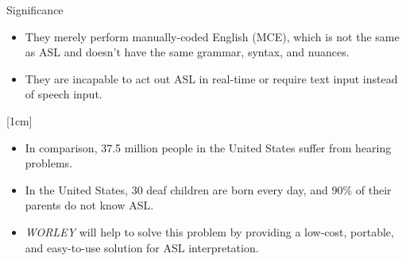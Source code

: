 \documentclass[final, 20pt]{beamer}
\newlength{\colwidth}
\newlength{\twocolwidth}
\begin{document}
\begin{frame}[t]
\begin{columns}[t]
\begin{column}{\twocolwidth}
\begin{block}{Significance}
\begin{minipage}[t]{0.48\linewidth}
    \begin{itemize}
      \item They merely perform manually-coded English (MCE), which is not the same as ASL and doesn't have the same grammar, syntax, and nuances.
      \item They are incapable to act out ASL in real-time or require text input instead of speech input.
    \end{itemize}
    \end{minipage}\hfill%
    \begin{minipage}[t]{0.48\linewidth}
      [1cm]
    
      \begin{itemize}
        \item In comparison, 37.5 million people in the United States suffer from hearing problems.
      
        \item In the United States, 30 deaf children are born every day, and 90\% of their parents do not know ASL.
        \item \emph{WORLEY} will help to solve this problem by providing a low-cost, portable, and easy-to-use solution for ASL interpretation.
      \end{itemize}
    \end{minipage}
    
  
  \end{block}


\end{column}
\end{columns}
\end{frame}
\end{document}
